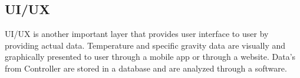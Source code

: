 \subsection{UI/UX}
UI/UX is another important layer that provides user interface to user by providing actual data. Temperature and specific gravity data are visually and graphically presented to user through a mobile app or through a website. Data's from Controller are stored in a database and are analyzed through a software.